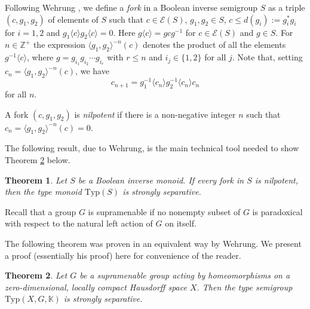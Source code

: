 \documentclass[11pt]{amsart}
\theoremstyle{plain}            %
\newtheorem{theorem}{Theorem}[section]
\theoremstyle{definition}       %
\theoremstyle{definition}       %
\theoremstyle{remark}
\newcommand{\Typ}{\mathrm{Typ}}
\def\Z{\mathbb{Z}}
\begin{document}
Following Wehrung \cite[Definition 5.3.1]{weh}, we define a {\it fork} in a Boolean inverse semigroup $S$ as a triple $(c,g_1,g_2)$ of elements of $S$ such that $c\in \mathcal E(S)$, $g_1,g_2\in S$, $c\le d(g_i):= g_i^* g_i$ for $i=1,2$ and $g_1\langle c \rangle g_2\langle c \rangle = 0$. Here $g\langle c\rangle = gcg^{-1}$ for $c\in \mathcal E (S)$ and $g\in S$. For $n\in \Z^+$ the expression $\langle g_1,g_2\rangle ^{-n} (c)$ denotes the product of all the elements $g^{-1}\langle c \rangle$, where $g= g_{i_1}g_{i_2}\cdots g_{i_r}$ with $r\le n$ and $i_j\in \{1,2\}$ for all $j$. Note that, setting $c_n = \langle g_1,g_2\rangle ^{-n}(c)$, we have 
$$c_{n+1} = g_1^{-1}\langle c_n \rangle  g_2^{-1} \langle c_n \rangle c_n$$
for all $n$.  

A fork $(c,g_1,g_2)$ is {\it nilpotent} if there is a non-negative integer $n$ such that 
$c_n= \langle g_1,g_2\rangle ^{-n} (c)= 0$.   

The following result, due to Wehrung, is the main technical tool needed to show Theorem \ref{thm:supramenable} below. 

\begin{theorem} {\rm \cite[Theorem 5.3.4]{weh}}
	\label{thm:nilpot-fork} Let $S$ be a Boolean inverse monoid. If every fork in $S$ is nilpotent, then the type monoid $\Typ (S)$ is strongly separative. 
\end{theorem}

Recall that a group $G$ is supramenable if no nonempty subset of $G$ is paradoxical with respect to the natural left action of $G$ on itself. 

The following theorem was proven in an equivalent way by Wehrung. We present a proof (essentially his proof)
here for convenience of the reader. 

\begin{theorem} {\rm \cite[Theorem 5.3.8]{weh}}
	\label{thm:supramenable}
	Let $G$ be a supramenable group acting by homeomorphisms on a zero-dimensional, locally compact Hausdorff space $X$. Then the type semigroup $\Typ (X,G,\mathbb K)$ is strongly separative. 
\end{theorem}
\end{document}
